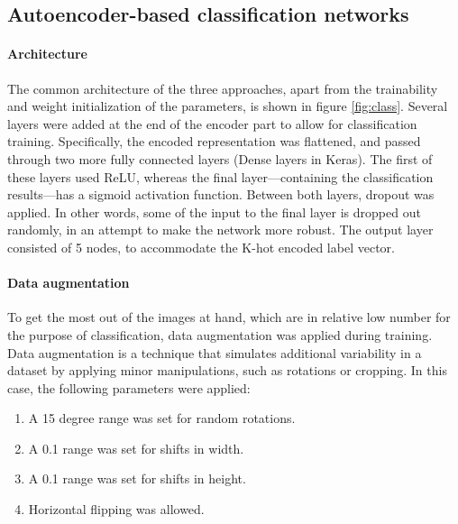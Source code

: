 \subsection{Autoencoder-based classification networks}
\label{sec:class_auto}


\paragraph{Architecture} 
The common architecture of the three approaches, apart from the trainability and weight initialization of the parameters, is shown in figure \ref{fig:class}. Several layers were added at the end of the encoder part to allow for classification training. Specifically, the encoded representation was flattened, and passed through two more fully connected layers (Dense layers in Keras). The first of these layers used ReLU, whereas the final layer---containing the classification results---has a sigmoid activation function. Between both layers, dropout was applied. In other words, some of the input to the final layer is dropped out randomly, in an attempt to make the network more robust. The output layer consisted of 5 nodes, to accommodate the K-hot encoded label vector.

\paragraph{Data augmentation} To get the most out of the images at hand, which are in relative low number for the purpose of classification, data augmentation was applied during training. Data augmentation is a technique that simulates additional variability in a dataset by applying minor manipulations, such as rotations or cropping. In this case, the following parameters were applied:

\begin{enumerate}

	\item A 15 degree range was set for random rotations.
	\item A 0.1 range was set for shifts in width.
	\item A 0.1 range was set for shifts in height.
	\item Horizontal flipping was allowed.
	
\end{enumerate}





